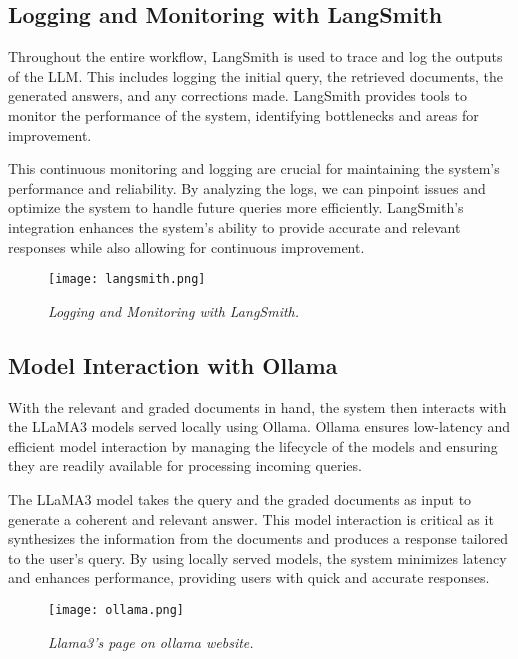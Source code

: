 \subsection{Logging and Monitoring with LangSmith}


Throughout the entire workflow, LangSmith is used to trace and log the outputs of the LLM. This includes logging the initial query, the retrieved documents, the generated answers, and any corrections made. LangSmith provides tools to monitor the performance of the system, identifying bottlenecks and areas for improvement.

This continuous monitoring and logging are crucial for maintaining the system's performance and reliability. By analyzing the logs, we can pinpoint issues and optimize the system to handle future queries more efficiently. LangSmith's integration enhances the system's ability to provide accurate and relevant responses while also allowing for continuous improvement.

\begin{figure}[H]
    \centering
    \texttt{[image: langsmith.png]}
    \caption{
        \it{Logging and Monitoring with LangSmith.}
    }
\end{figure}

\subsection{Model Interaction with Ollama}


With the relevant and graded documents in hand, the system then interacts with the LLaMA3 models served locally using Ollama. Ollama ensures low-latency and efficient model interaction by managing the lifecycle of the models and ensuring they are readily available for processing incoming queries.

The LLaMA3 model takes the query and the graded documents as input to generate a coherent and relevant answer. This model interaction is critical as it synthesizes the information from the documents and produces a response tailored to the user's query. By using locally served models, the system minimizes latency and enhances performance, providing users with quick and accurate responses.

\begin{figure}[H]
    \centering
    \texttt{[image: ollama.png]}
    \caption{
        \it{Llama3's page on ollama website.}
    }
\end{figure}

